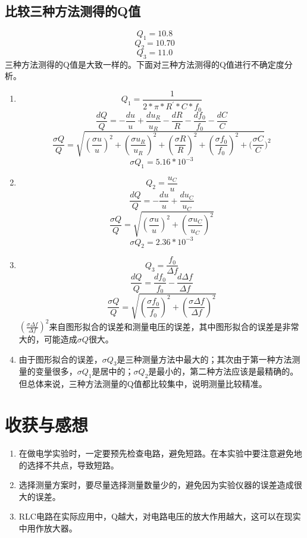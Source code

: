 \documentclass[a4paper,11pt]{article}
\begin{document}
\subsection{比较三种方法测得的Q值}
$$ Q_{1} = 10.8 $$
$$ Q_{2} = 10.70 $$
$$ Q_{3} = 11.0 $$
三种方法测得的Q值是大致一样的。下面对三种方法测得的Q值进行不确定度分析。
\begin{enumerate}
	\item $$ Q_{1} = \dfrac{1}{ 2* \pi * R^{\prime} * C * f_{0}} $$
	$$ \frac{dQ}{Q} = - \frac{du}{u} + \frac{du_{R}}{u_{R}} - \frac{dR}{R} - \frac{df_{0}}{f_{0}} - \frac{dC}{C}$$
	$$ \frac{\sigma Q}{Q} =\sqrt{  (\frac{\sigma u}{u})^{2} + (\frac{\sigma u_{R}}{u_{R}})^{2} + (\frac{ \sigma R}{R})^{2} + (\frac{\sigma f_{0}}{f_{0}})^{2} + (\frac{\sigma C}{C}})^{2} $$
	$$ \sigma Q_{1} = 5.16 * 10^{-3} $$
	\item $$ Q_{2} = \dfrac{ u_{C} }{ u } $$
	$$ \frac{dQ}{Q} = - \frac{du}{u} + \frac{du_{C}}{u_{C}} $$
	$$ \frac{\sigma Q}{Q} =\sqrt{  (\frac{\sigma u}{u})^{2} + (\frac{\sigma u_{C}}{u_{C}})^{2}} $$
	$$ \sigma Q_{2} = 2.36 * 10^{-3} $$
	\item $$ Q_{3} = \dfrac{f_{0}}{\Delta f} $$
	$$\frac{dQ}{Q} =  \frac{df_{0}}{f_{0}} - \frac{d\Delta f}{\Delta f}$$
	$$ \frac{\sigma Q}{Q} =\sqrt{  (\frac{\sigma f_{0}}{f_{0}})^{2} + (\frac{\sigma \Delta f}{\Delta f})^{2}} $$
	$(\frac{\sigma \Delta f}{\Delta f})^{2}$来自图形拟合的误差和测量电压的误差，其中图形拟合的误差是非常大的，可能造成$ \sigma Q $很大。
	\item 由于图形拟合的误差，$ \sigma Q_{3} $是三种测量方法中最大的；其次由于第一种方法测量的变量很多，$ \sigma Q_{1} $是居中的；$ \sigma Q_{2} $是最小的，第二种方法应该是最精确的。但总体来说，三种方法测量的Q值都比较集中，说明测量比较精准。
\end{enumerate}
	
\section{收获与感想}
\begin{enumerate}
	\item 在做电学实验时，一定要预先检查电路，避免短路。在本实验中要注意避免地的选择不共点，导致短路。
	\item 选择测量方案时，要尽量选择测量数量少的，避免因为实验仪器的误差造成很大的误差。
	\item RLC电路在实际应用中，Q越大，对电路电压的放大作用越大，这可以在现实中用作放大器。
\end{enumerate}
\end{document}
